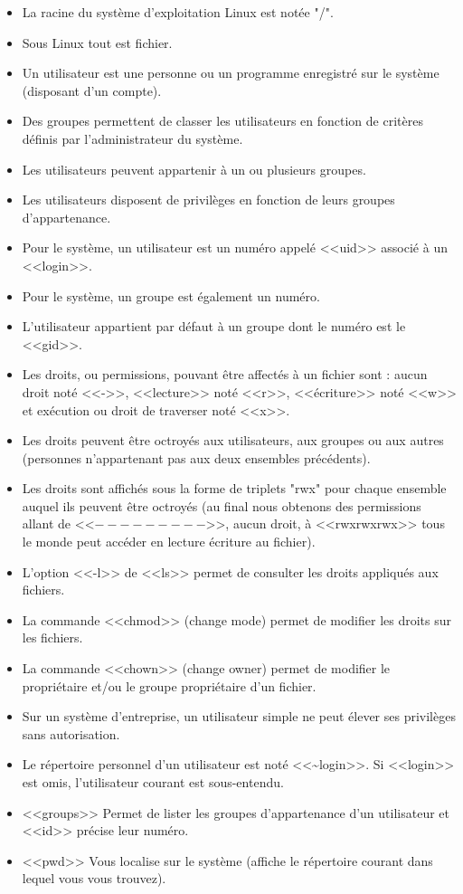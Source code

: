 \documentclass[11pt]{article}
\begin{document}
\begin{itemize}
 \item La racine du système d'exploitation Linux est notée "/".
 \item Sous Linux tout est fichier.
 \item Un utilisateur est une personne ou un programme enregistré sur le système (disposant d'un compte).
 \item Des groupes permettent de classer les utilisateurs en fonction de critères définis par l'administrateur du système.
 \item Les utilisateurs peuvent appartenir à un ou plusieurs groupes.
 \item Les utilisateurs disposent de privilèges en fonction de leurs groupes d'appartenance.
 \item Pour le système, un utilisateur est un numéro appelé <<uid>> associé à un <<login>>.
 \item Pour le système, un groupe est également un numéro.
 \item L'utilisateur appartient par défaut à un groupe dont le numéro est le <<gid>>.
 \item Les droits, ou permissions, pouvant être affectés à un fichier sont : aucun droit noté <<->>, <<lecture>> noté <<r>>, <<écriture>> noté <<w>> et exécution ou droit de traverser noté <<x>>.
 \item Les droits peuvent être octroyés aux utilisateurs, aux groupes ou aux autres (personnes n'appartenant pas aux deux ensembles précédents).
 \item Les droits sont affichés sous la forme de triplets "rwx" pour chaque ensemble auquel ils peuvent être octroyés (au final nous obtenons des permissions allant de <<$---------$>>, aucun droit, à <<rwxrwxrwx>> tous le monde peut accéder en lecture écriture au fichier).
 \item L'option <<-l>> de <<ls>> permet de consulter les droits appliqués aux fichiers.
 \item La commande <<chmod>> (change mode) permet de modifier les droits sur les fichiers.
 \item La commande <<chown>> (change owner) permet de modifier le propriétaire et/ou le groupe propriétaire d'un fichier.
 \item Sur un système d'entreprise, un utilisateur simple ne peut élever ses privilèges sans autorisation.
 \item Le répertoire personnel d'un utilisateur est noté <<\textasciitilde{}login>>. Si <<login>> est omis, l'utilisateur courant est sous-entendu.
 \item <<groups>> Permet de lister les groupes d'appartenance d'un utilisateur et <<id>> précise leur numéro.
 \item <<pwd>> Vous localise sur le système (affiche le répertoire courant dans lequel vous vous trouvez).
\end{itemize}
\end{document}
